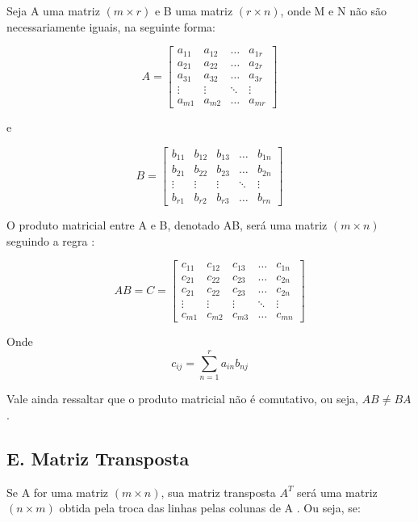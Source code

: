 \documentclass[twocolumn, 10pt]{extarticle}
\begin{document}
Seja A uma matriz $(m \times r)$ e B uma matriz $(r \times n)$, onde M e N não são necessariamente iguais, na seguinte forma:

\[ 
A = 
\begin{bmatrix}
a_{11} & a_{12} & \dots & a_{1r} \\
a_{21} & a_{22} & \dots & a_{2r} \\
a_{31} & a_{32} & \dots & a_{3r} \\
\vdots & \vdots & \ddots & \vdots \\
a_{m1} & a_{m2} & \dots & a_{mr} 

\end{bmatrix}
\]

e

\[ 
B = 
\begin{bmatrix}
b_{11} & b_{12} & b_{13} & \dots & b_{1n} \\
b_{21} & b_{22} & b_{23} & \dots & b_{2n} \\
\vdots & \vdots & \vdots & \ddots & \vdots \\
b_{r1} & b_{r2} & b_{r3} & \dots & b_{rn} 

\end{bmatrix}
\]

O produto matricial entre A e B, denotado AB, será uma matriz $(m \times n)$ seguindo a regra \cite[p. 30]{antonAlgebra}: 

\[ 
AB = C =
\begin{bmatrix}
c_{11} & c_{12} & c_{13} & \dots & c_{1n} \\
c_{21} & c_{22} & c_{23} & \dots & c_{2n} \\
c_{21} & c_{22} & c_{23} & \dots & c_{2n} \\
\vdots & \vdots & \vdots & \ddots & \vdots \\
c_{m1} & c_{m2} & c_{m3} & \dots & c_{mn} 

\end{bmatrix}
\]

Onde \[c_{ij} = \sum_{n=1}^{r} a_{in}b_{nj}\]

Vale ainda ressaltar que o produto matricial não é comutativo, ou seja, $AB \neq BA$.

\subsection*{E. \quad Matriz Transposta}

Se A for uma matriz $(m \times n)$, sua matriz transposta $A^T$ será uma matriz $(n \times m)$ obtida pela troca das linhas pelas colunas de A \cite[p. 34]{antonAlgebra}. Ou seja, se:
\end{document}
